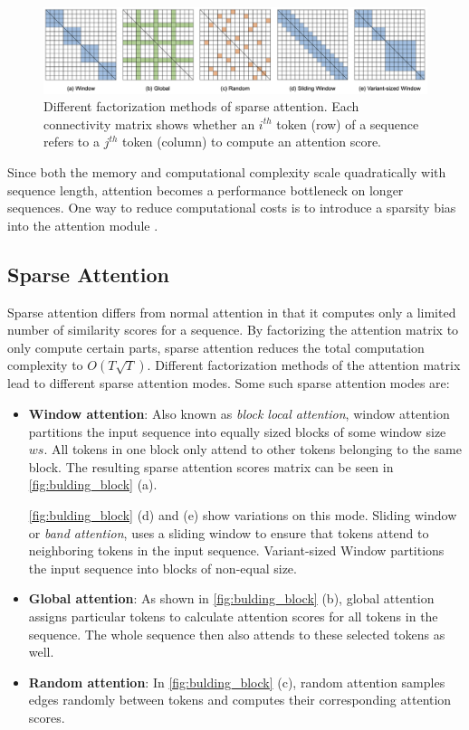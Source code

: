 \documentclass[11pt]{article}
\begin{document}
\begin{figure}[t]
  \centering
  \includegraphics[width=\linewidth]{figures/building_block.png}
  \caption{Different factorization methods of sparse attention.  Each connectivity matrix shows whether an $i^{th}$ token (row) of a sequence refers to a $j^{th}$ token (column) to compute an attention score.}
 \label{fig:bulding_block}
\end{figure}

Since both the memory and computational complexity scale quadratically with sequence length, attention becomes a performance bottleneck on longer sequences. One way to reduce computational costs is to introduce a sparsity bias into the attention module \cite{child2019generating}.
\subsection{Sparse Attention} \label{sub:sparse}
Sparse attention differs from normal attention in that it computes only a limited number of similarity scores for a sequence. By factorizing the attention matrix to only compute certain parts, sparse attention reduces the total computation complexity to $O(T\sqrt{T})$. Different factorization methods of the attention matrix lead to different sparse attention modes. Some such sparse attention modes are:


\begin{itemize}
    \item \textbf{Window attention}: Also known as \textit{block local attention}, window attention partitions the input sequence into equally sized blocks of some window size $ws$. All tokens in one block only attend to other tokens belonging to the same block. The resulting sparse attention scores matrix can be seen in \autoref{fig:bulding_block} (a). 
    
    \autoref{fig:bulding_block} (d) and (e) show variations on this mode. Sliding window or \textit{band attention}, uses a sliding window to ensure that tokens attend to neighboring tokens in the input sequence. Variant-sized Window partitions the input sequence into blocks of non-equal size. 
    \item \textbf{Global attention}: As shown in \autoref{fig:bulding_block} (b), global attention assigns particular tokens to calculate attention scores for all tokens in the sequence. The whole sequence then also attends to these selected tokens as well.
    \item \textbf{Random attention}: In \autoref{fig:bulding_block} (c), random attention samples edges randomly between tokens and computes their corresponding attention scores.  
\end{itemize}
\end{document}
